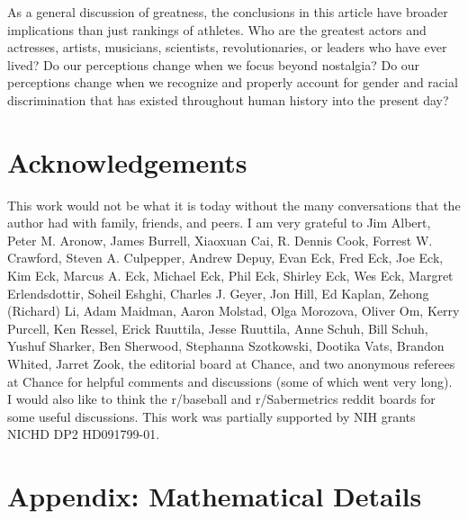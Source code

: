 \documentclass[11pt]{article}\usepackage[]{graphicx}\usepackage[]{color}
\begin{document}
As a general discussion of greatness, the conclusions in this article have 
broader implications than just rankings of athletes. 
Who are the greatest  
actors and actresses, 
artists,
musicians, 
scientists, 
revolutionaries,
or 
leaders who have ever lived?  
Do our perceptions change when we focus beyond nostalgia?  
Do our perceptions change when we recognize and properly account for 
gender and racial discrimination that has existed throughout human 
history into the present day?   



\section*{Acknowledgements}

This work would not be what it is today without the many conversations that 
the author had with family, friends, and peers.
I am very grateful to 
Jim Albert, 
Peter M. Aronow, 
James Burrell, 
Xiaoxuan Cai, 
R. Dennis Cook, 
Forrest W. Crawford, 
Steven A. Culpepper, 
Andrew Depuy, 
Evan Eck, 
Fred Eck, 
Joe Eck,
Kim Eck, 
Marcus A. Eck, 
Michael Eck, 
Phil Eck, 
Shirley Eck, 
Wes Eck, 
Margret Erlendsdottir, 
Soheil Eshghi, 
Charles J. Geyer, 
Jon Hill,
Ed Kaplan, 
Zehong (Richard) Li, 
Adam Maidman, 
Aaron Molstad, 
Olga Morozova, 
Oliver Om, 
Kerry Purcell, 
Ken Ressel, 
Erick Ruuttila, 
Jesse Ruuttila, 
Anne Schuh, 
Bill Schuh, 
Yushuf Sharker, 
Ben Sherwood, 
Stephanna Szotkowski,
Dootika Vats,
Brandon Whited,
Jarret Zook,
the editorial board at Chance, 
and 
two anonymous referees at Chance
for helpful comments and discussions (some of which went very long).  
I would also like to think the r/baseball and r/Sabermetrics reddit boards 
for some useful discussions.  
This work was partially supported by NIH grants NICHD DP2 HD091799-01.




\section*{Appendix: Mathematical Details}
\end{document}
